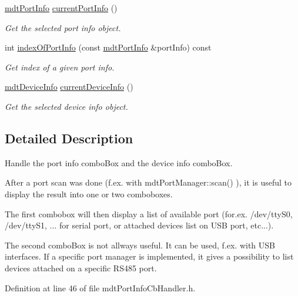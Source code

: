\begin{DoxyCompactItemize}
\hyperlink{classmdt_port_info}{mdt\-Port\-Info} \hyperlink{classmdt_port_info_cb_handler_a5723df72c4f1eda572c04e377dde9351}{current\-Port\-Info} ()
\begin{DoxyCompactList}\small\item\em Get the selected port info object. \end{DoxyCompactList}\item 
int \hyperlink{classmdt_port_info_cb_handler_ace2f9273d3f508507e496bdb2dc6d5c6}{index\-Of\-Port\-Info} (const \hyperlink{classmdt_port_info}{mdt\-Port\-Info} \&port\-Info) const 
\begin{DoxyCompactList}\small\item\em Get index of a given port info. \end{DoxyCompactList}\item 
\hyperlink{classmdt_device_info}{mdt\-Device\-Info} \hyperlink{classmdt_port_info_cb_handler_a266598f7f403e21730ff5ee50e6a6e5f}{current\-Device\-Info} ()
\begin{DoxyCompactList}\small\item\em Get the selected device info object. \end{DoxyCompactList}\end{DoxyCompactItemize}


\subsection{Detailed Description}
Handle the port info combo\-Box and the device info combo\-Box. 

After a port scan was done (f.\-ex. with mdt\-Port\-Manager\-::scan() ), it is useful to display the result into one or two comboboxes.

The first combobox will then display a list of available port (for.\-ex. /dev/tty\-S0, /dev/tty\-S1, ... for serial port, or attached devices list on U\-S\-B port, etc...).

The second combo\-Box is not allways useful. It can be used, f.\-ex. with U\-S\-B interfaces. If a specific port manager is implemented, it gives a possibility to list devices attached on a specific R\-S485 port. 

Definition at line 46 of file mdt\-Port\-Info\-Cb\-Handler.\-h.



